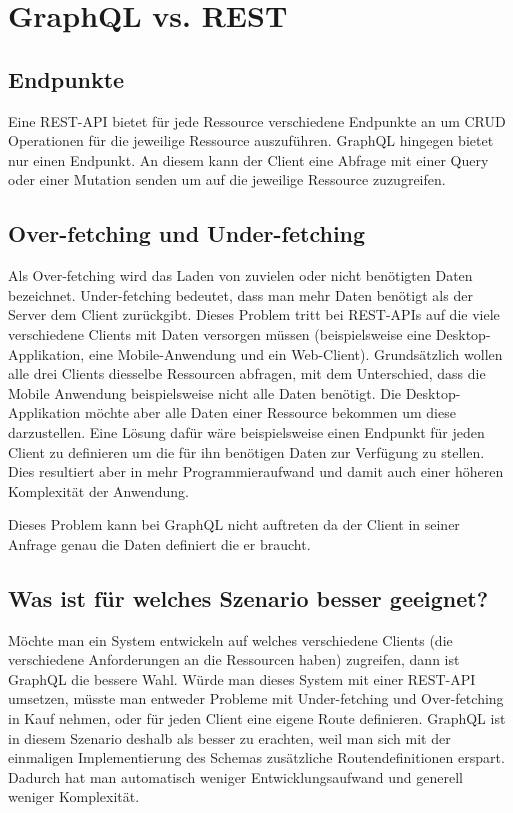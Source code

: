 \documentclass[bachelor, german ]{hgbthesis}
\begin{document}
\section{GraphQL vs. REST}
\subsection{Endpunkte}
Eine REST-API bietet für jede Ressource verschiedene Endpunkte an um CRUD Operationen für die jeweilige Ressource auszuführen. GraphQL hingegen bietet nur einen
Endpunkt. An diesem kann der Client eine Abfrage mit einer Query oder einer Mutation senden um auf die jeweilige Ressource zuzugreifen.

\subsection{Over-fetching und Under-fetching}
Als Over-fetching wird das Laden von zuvielen oder nicht benötigten Daten bezeichnet.
Under-fetching bedeutet, dass man mehr Daten benötigt als der Server dem Client zurückgibt. Dieses Problem tritt bei REST-APIs auf die viele verschiedene Clients mit Daten versorgen müssen (beispielsweise eine Desktop-Applikation, eine Mobile-Anwendung
und ein Web-Client). Grundsätzlich wollen alle drei Clients diesselbe Ressourcen abfragen, mit dem Unterschied, dass die Mobile Anwendung beispielsweise nicht alle Daten
benötigt. Die Desktop-Applikation möchte aber alle Daten einer Ressource bekommen
um diese darzustellen. Eine Lösung dafür wäre beispielsweise einen Endpunkt für jeden
Client zu definieren um die für ihn benötigen Daten zur Verfügung zu stellen. Dies resultiert aber in mehr Programmieraufwand und damit auch einer höheren Komplexität
der Anwendung.
\newline

Dieses Problem kann bei GraphQL nicht auftreten da der Client in seiner Anfrage genau die Daten definiert die er braucht.

\subsection{Was ist für welches Szenario besser geeignet?}
Möchte man ein System entwickeln auf welches verschiedene Clients (die verschiedene Anforderungen an die Ressourcen haben) zugreifen, dann ist GraphQL die bessere
Wahl. Würde man dieses System mit einer REST-API umsetzen, müsste man entweder
Probleme mit Under-fetching und Over-fetching in Kauf nehmen, oder für jeden Client eine eigene Route definieren. GraphQL ist in diesem Szenario deshalb als besser zu
erachten, weil man sich mit der einmaligen Implementierung des Schemas zusätzliche
Routendefinitionen erspart. Dadurch hat man automatisch weniger Entwicklungsaufwand und generell weniger Komplexität.
\newline
\end{document}
